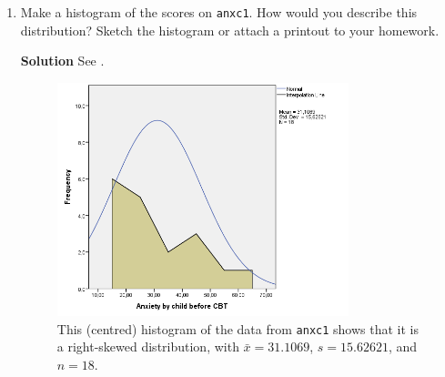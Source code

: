 \begin{enumerate}
\begin{enumerate}
        \item Make a histogram of the scores on \texttt{anxc1}. How would you describe this distribution? Sketch the histogram or attach a printout to your homework.
        \begin{framed}{\textbf{Solution}}
        See .
        \end{framed}
        \FloatBarrier
        \begin{figure}[h]
            \centering
            \includegraphics[width=0.8\textwidth]{STATS1B-HW4-Q5b-1}
            \caption{This (centred) histogram of the data from \texttt{anxc1} shows that it is a right-skewed distribution, with $\bar{x}=31.1069$, $s=15.62621$, and $n=18$.}
            \label{fig:hw4q5b}
        \end{figure}
        \FloatBarrier
    \end{enumerate}
\end{enumerate}

